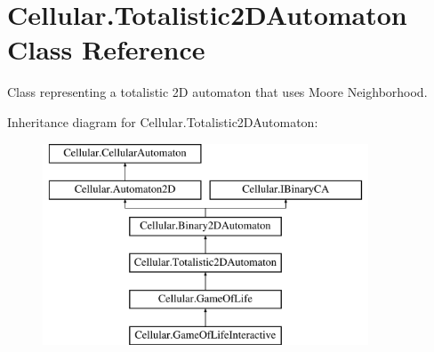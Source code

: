 \hypertarget{class_cellular_1_1_totalistic2_d_automaton}{}\section{Cellular.\+Totalistic2\+D\+Automaton Class Reference}
\label{class_cellular_1_1_totalistic2_d_automaton}


Class representing a totalistic 2\+D automaton that uses Moore Neighborhood.  


Inheritance diagram for Cellular.\+Totalistic2\+D\+Automaton\+:\begin{figure}[H]
\begin{center}
\leavevmode
\includegraphics[height=6.000000cm]{class_cellular_1_1_totalistic2_d_automaton}
\end{center}
\end{figure}
